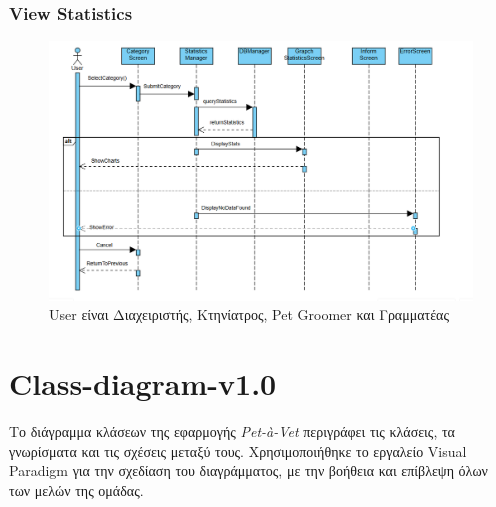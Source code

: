 \documentclass[12pt,a4paper,twoside]{book}
\begin{document}
\subsection{View Statistics}
\begin{figure}[H]
    \centering
    \includegraphics[width=\textwidth]{Resources/Sequence Diagram/StatisticsSequence.png}
    \caption{User είναι Διαχειριστής, Κτηνίατρος, Pet Groomer και Γραμματέας}\label{fig:sequence-view-statistics}
\end{figure}

\chapter{Class-diagram-v1.0}

Το διάγραμμα κλάσεων της εφαρμογής \textit{Pet-à-Vet} περιγράφει τις κλάσεις, τα γνωρίσματα και τις σχέσεις μεταξύ τους. Χρησιμοποιήθηκε το εργαλείο Visual Paradigm για την σχεδίαση του διαγράμματος, με την βοήθεια και επίβλεψη όλων των μελών της ομάδας. %
\end{document}
